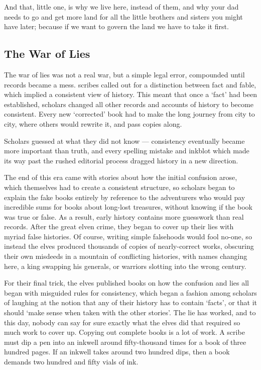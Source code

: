 \begin{exampletext}
  And that, little one, is why we live here, instead of them, and why your dad needs to go and get more land for all the little brothers and sisters you might have later; because if we want to govern the land we have to take it first.
\fi

\end{exampletext}

\subsection{The War of Lies}
\label{warOfLies}


\begin{exampletext}
  \ifcase\value{r6}\relax\or
    The war of lies was not a real war, but a simple legal error, compounded until records became a mess.
    \Glspl{scribe} called out for a distinction between fact and fable, which implied a consistent view of history.
    This meant that once a `fact' had been established, scholars changed all other records and accounts of history to become consistent.
    Every new `corrected' book had to make the long journey from city to city, where others would rewrite it, and pass copies along.

    Scholars guessed at what they did not know --- consistency eventually became more important than truth, and every spelling mistake and inkblot which made its way past the rushed editorial process dragged history in a new direction.

    The end of this era came with stories about how the initial confusion arose, which themselves had to create a consistent structure, so scholars began to explain the fake books entirely by reference to the adventurers who would pay incredible sums for books about long-lost treasures, without knowing if the book was true or false.
    As a result, early history contains more guesswork than real records.
  \or
    After the great elven crime, they began to cover up their lies with myriad false histories.
    Of course, writing simple falsehoods would fool no-one, so instead the elves produced thousands of copies of nearly-correct works, obscuring their own misdeeds in a mountain of conflicting histories, with names changing here, a king swapping his generals, or warriors slotting into the wrong century.

    For their final trick, the elves published books on how the confusion and lies all began with misguided rules for consistency, which began a fashion among scholars of laughing at the notion that any of their history has to contain `facts', or that it should `make sense when taken with the other stories'.
    The lie has worked, and to this day, nobody can say for sure exactly what the elves did that required so much work to cover up.
  \or
    Copying out complete books is a lot of work.
    A scribe must dip a pen into an inkwell around fifty-thousand times for a book of three hundred pages.
    If an inkwell takes around two hundred dips, then a book demands two hundred and fifty vials of ink.


\end{exampletext}
